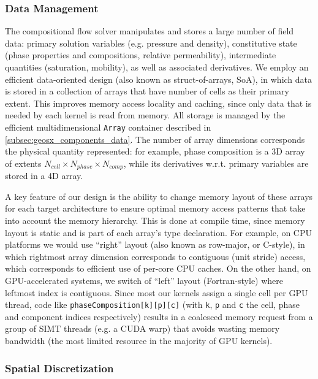 \subsubsection{Data Management}

The compositional flow solver manipulates and stores a large number of field data: primary solution variables (e.g. pressure and density), constitutive state (phase properties and compositions, relative permeability), intermediate quantities (saturation, mobility), as well as associated derivatives.   We employ an efficient data-oriented design (also known as struct-of-arrays, SoA), in which data is stored in a collection of arrays that have number of cells as their primary extent.   This improves memory access locality and caching, since only data that is needed by each kernel is read from memory.   All storage is managed by the efficient multidimensional \texttt{Array} container described in \cref{subsec:geosx_components_data}.   The number of array dimensions corresponds the physical quantity represented: for example, phase composition is a 3D array of extents $N_{cell} \times N_{phase} \times N_{comp}$, while its derivatives w.r.t. primary variables are stored in a 4D array.

A key feature of our design is the ability to change memory layout of these arrays for each target architecture to ensure optimal memory access patterns that take into account the memory hierarchy.   This is done at compile time, since memory layout is static and is part of each array's type declaration.   For example, on CPU platforms we would use ``right'' layout (also known as row-major, or C-style), in which rightmost array dimension corresponds to contiguous (unit stride) access, which corresponds to efficient use of per-core CPU caches.   On the other hand, on GPU-accelerated systems, we switch of ``left'' layout (Fortran-style) where leftmost index is contiguous.   Since most our kernels assign a single cell per GPU thread, code like \texttt{phaseComposition[k][p][c]} (with \texttt{k}, \texttt{p} and \texttt{c} the cell, phase and component indices respectively) results in a coalesced memory request from a group of SIMT threads (e.g. a CUDA warp) that avoids wasting memory bandwidth (the most limited resource in the majority of GPU kernels).

\subsubsection{Spatial Discretization}

